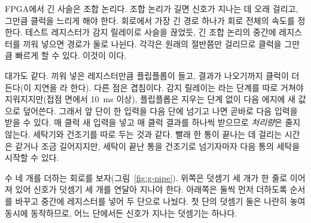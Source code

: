 \Why FPGA에서 긴 사슬은 조합 논리다. 조합 논리가 길면 신호가 지나는 데 오래 걸리고, 그만큼 클럭을 느리게
해야 한다. 회로에서 가장 긴 경로 하나가 회로 전체의 속도를 정한다. 테스트 레지스터가 감지 릴레이로 사슬을
끊었듯, 긴 조합 논리의 중간에 레지스터를 끼워 넣으면 경로가 둘로 나뉜다. 각각은 원래의 절반쯤만 걸리므로
클럭을 그만큼 빠르게 할 수 있다. 이것이 이다.

대가도 같다. 끼워 넣은 레지스터만큼 플립플롭이 들고, 결과가 나오기까지 클럭이 더 든다(이 지연을
라 한다). 다른 점은 겹침이다. 감지 릴레이는 라는 단계를 따로 거쳐야
지워지지만(접점 면에서 10~ms 이상), 플립플롭은 지우는 단계 없이 다음 에지에 새 값으로 덮어쓴다. 그래서 앞
단이 한 입력을 다음 단에 넘기고 나면 곧바로 다음 입력을 받을 수 있다. 매 클럭 새 입력을 넣고 매 클럭 결과를
하나씩 받으므로 \emph{처리량}은 줄지 않는다. 세탁기와 건조기를 따로 두는 것과 같다. 빨래 한 통이 끝나는 데
걸리는 시간은 같거나 조금 길어지지만, 세탁이 끝난 통을 건조기로 넘기자마자 다음 통의 세탁을 시작할 수 있다.

\General 수 네 개를 더하는 회로를 보자(그림~\ref{fig:g-pipe}). 위쪽은 덧셈기 세 개가 한 줄로 이어져 있어
신호가 덧셈기 세 개를 연달아 지나야 한다. 아래쪽은 둘씩 먼저 더하도록 순서를 바꾸고 중간에 레지스터를 넣어
두 단으로 나눴다. 첫 단의 덧셈기 둘은 나란히 놓여 동시에 동작하므로, 어느 단에서든 신호가 지나는 덧셈기는
하나다.

